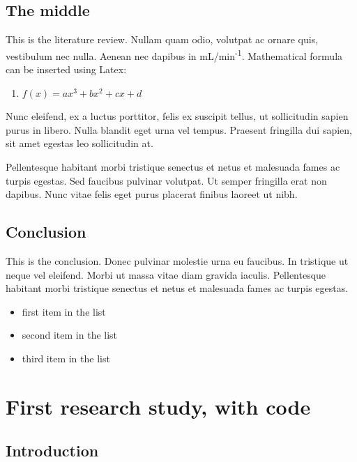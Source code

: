 \documentclass[12pt,a4paper,]{report}
\providecommand{\tightlist}{%
  \setlength{\itemsep}{0pt}\setlength{\parskip}{0pt}}
\begin{document}
\section{The middle}\label{the-middle}

This is the literature review. Nullam quam odio, volutpat ac ornare
quis, vestibulum nec nulla. Aenean nec dapibus in
mL/min\textsuperscript{-1}. Mathematical formula can be inserted using
Latex:

\begin{enumerate}
\def\labelenumi{(\arabic{enumi})}
\tightlist
\item
  \(f(x) = ax^3 + bx^2 + cx + d\)
\end{enumerate}

Nunc eleifend, ex a luctus porttitor, felis ex suscipit tellus, ut
sollicitudin sapien purus in libero. Nulla blandit eget urna vel tempus.
Praesent fringilla dui sapien, sit amet egestas leo sollicitudin at.

Pellentesque habitant morbi tristique senectus et netus et malesuada
fames ac turpis egestas. Sed faucibus pulvinar volutpat. Ut semper
fringilla erat non dapibus. Nunc vitae felis eget purus placerat finibus
laoreet ut nibh.

\section{Conclusion}\label{conclusion}

This is the conclusion. Donec pulvinar molestie urna eu faucibus. In
tristique ut neque vel eleifend. Morbi ut massa vitae diam gravida
iaculis. Pellentesque habitant morbi tristique senectus et netus et
malesuada fames ac turpis egestas.

\begin{itemize}
\tightlist
\item
  first item in the list
\item
  second item in the list
\item
  third item in the list
\end{itemize}

\chapter{First research study, with
code}\label{first-research-study-with-code}

\section{Introduction}\label{introduction-2}
\end{document}
